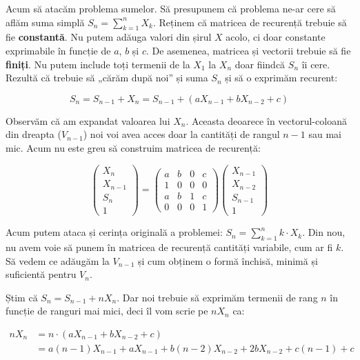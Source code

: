 \documentclass[../main.tex]{subfiles}
\begin{document}
Acum să atacăm problema sumelor. Să presupunem că problema ne-ar cere să aflăm suma simplă $S_n = \sum_{k=1}^{n} X_k$. Reținem că matricea de recurență trebuie să fie \textbf{constantă}. Nu putem adăuga valori din șirul $X$ acolo, ci doar constante exprimabile în funcție de $a$, $b$ și $c$. De asemenea, matricea și vectorii trebuie să fie \textbf{finiți}. Nu putem include toți termenii de la $X_1$ la $X_n$ doar fiindcă $S_n$ îi cere. Rezultă că trebuie să „cărăm după noi” și suma $S_n$ și să o exprimăm recurent:

$$S_n = S_{n-1} + X_n = S_{n-1} + (a X_{n-1} + b X_{n-2} + c)$$

Observăm că am expandat valoarea lui $X_n$. Aceasta deoarece în vectorul-coloană din dreapta ($V_{n-1}$) noi voi avea acces doar la cantități de rangul $n-1$ sau mai mic. Acum nu este greu să construim matricea de recurență:

$$
\begin{pmatrix}
  X_n \\ X_{n-1} \\ S_n \\ 1
\end{pmatrix}
=
\begin{pmatrix}
  a & b & 0 & c\\
  1 & 0 & 0 & 0\\
  a & b & 1 & c\\
  0 & 0 & 0 & 1
\end{pmatrix}
\begin{pmatrix}
  X_{n-1} \\ X_{n-2} \\ S_{n-1} \\ 1
\end{pmatrix}
$$

Acum putem ataca și cerința originală a problemei: $S_n = \sum_{k=1}^{n} k \cdot X_k$. Din nou, nu avem voie să punem în matricea de recurență cantități variabile, cum ar fi $k$. Să vedem ce adăugăm la $V_{n-1}$ și cum obținem o formă închisă, minimă și suficientă pentru $V_n$.

Știm că $S_n = S_{n-1} + n X_n$. Dar noi trebuie să exprimăm termenii de rang $n$ în funcție de ranguri mai mici, deci îl vom scrie pe $n X_n$ ca:

\begin{align*}
  n X_n &= n \cdot (a X_{n-1} + b X_{n-2} + c) \\
  &= a (n - 1) X_{n - 1} + a X_{n - 1} + b (n - 2) X_{n - 2} + 2 b X_{n - 2} + c (n - 1) + c
\end{align*}
\end{document}
